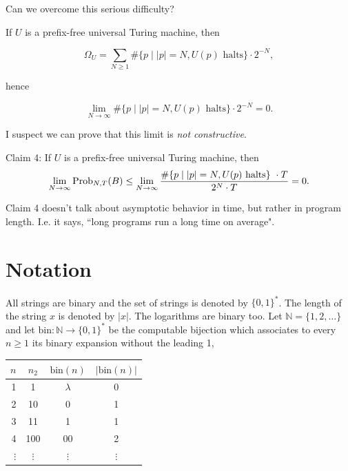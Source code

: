 \documentclass[12pt,twoside,openright]{report}
\newcommand{\NN}{\mathbb{N}}
\newcommand{\ctr}[1]{\begin{center} #1 \end{center}}
\newcommand{\bin}{\mbox{bin}}
\newcommand{\Prob}{{\rm Prob}}
\begin{document}
Can we overcome this serious difficulty?

\medskip

If $U$ is a prefix-free universal Turing machine, then

\[\Omega_{U} = \sum_{N\ge 1} \#\{ p \mid |p|=N, U(p) \mbox{  halts}\}\cdot 2^{-N},\]

\noindent hence

\[\lim_{N \rightarrow \infty}   \#\{ p \mid |p|=N, U(p) \mbox{  halts}\}\cdot 2^{-N}=0.\]

I suspect we can prove that this limit is {\it not constructive}.

\medskip

Claim 4:   If $U$ is a prefix-free universal Turing machine, then $$\lim_{N \rightarrow \infty}\Prob_{N,T}(B) \le \lim_{N \rightarrow \infty}
\frac{ \#\{ p \mid |p|=N, U(p) \mbox{  halts}\}\ \cdot T}{2^{N} \cdot T} =0.$$


Claim 4 doesn't talk about asymptotic behavior in time, but rather in program length.  I.e. it says,  ``long programs run a long time on average".
\fi
 
 
 
 


\section{Notation}

All strings are binary and the set of strings is denoted by $\{0, 1\}^{*}$.  The length of the string $x$ is denoted by $|x|$. The logarithms are binary too.  Let $\NN = \{1,2,\ldots\}$ and let $\bin:\NN \rightarrow \{0, 1\}^*$ be the computable bijection which associates to every $n\ge 1$ its binary expansion without the leading 1,  
\ctr{\begin{tabular}{r|c|c|c}
$n$&$n_2$&$\bin(n)$& $|\bin(n)|$\\
\hline
1&1&$\lambda$ & 0\\
2&10&0 & 1\\
3&11&1& 1\\
4&100&00 & 2\\
$\vdots$&$\vdots$&$\vdots$&$\vdots$
\end{tabular}}
\end{document}
